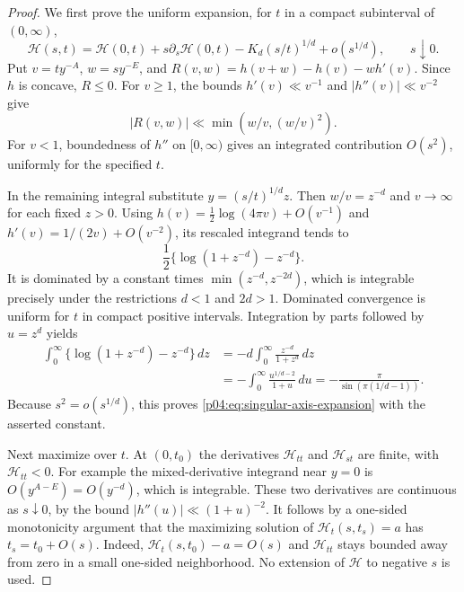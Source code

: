 \documentclass[11pt,letterpaper]{article}
\theoremstyle{definition}
\theoremstyle{remark}
\newcommand{\1}{\mathbf 1}
\begin{document}
\begin{proof}
We first prove the uniform expansion, for $t$ in a compact
subinterval of $(0,\infty)$,
\begin{equation}\label{p04:eq:singular-axis-expansion}
 \mathcal H(s,t)=\mathcal H(0,t)
       +s\partial_s\mathcal H(0,t)
       -K_d(s/t)^{1/d}+o(s^{1/d}),\qquad s\downarrow0.
\end{equation}
Put $v=ty^{-A}$, $w=sy^{-E}$, and
$R(v,w)=h(v+w)-h(v)-wh'(v)$. Since $h$ is concave,
$R\le0$. For $v\ge1$, the bounds $h'(v)\ll v^{-1}$ and
$|h''(v)|\ll v^{-2}$ give
\[
 |R(v,w)|\ll\min(w/v,(w/v)^2).
\]
For $v<1$, boundedness of $h''$ on $[0,\infty)$ gives an
integrated contribution $O(s^2)$, uniformly for the specified $t$.

In the remaining integral substitute $y=(s/t)^{1/d}z$.
Then $w/v=z^{-d}$ and $v\to\infty$ for each fixed $z>0$.
Using $h(v)=\frac12\log(4\pi v)+O(v^{-1})$ and
$h'(v)=1/(2v)+O(v^{-2})$, its rescaled integrand tends to
\[
 \frac12\{\log(1+z^{-d})-z^{-d}\}.
\]
It is dominated by a constant times
$\min(z^{-d},z^{-2d})$, which is integrable precisely under
the restrictions $d<1$ and $2d>1$. Dominated convergence is
uniform for $t$ in compact positive intervals. Integration by
parts followed by $u=z^d$ yields
\[
 \begin{split}
 \int_0^\infty\{\log(1+z^{-d})-z^{-d}\}\,dz
 &=-d\int_0^\infty\frac{z^{-d}}{1+z^d}\,dz\\
 &=-\int_0^\infty\frac{u^{1/d-2}}{1+u}\,du
 =-\frac\pi{\sin(\pi(1/d-1))}.
 \end{split}
\]
Because $s^2=o(s^{1/d})$, this proves
\eqref{p04:eq:singular-axis-expansion} with the asserted constant.

Next maximize over $t$. At $(0,t_0)$ the derivatives
$\mathcal H_{tt}$ and $\mathcal H_{st}$ are finite, with
$\mathcal H_{tt}<0$. For example the mixed-derivative integrand
near $y=0$ is $O(y^{A-E})=O(y^{-d})$, which is integrable.
These two derivatives are continuous as $s\downarrow0$, by the
bound $|h''(u)|\ll(1+u)^{-2}$. It follows by a one-sided
monotonicity argument that the maximizing solution of
$\mathcal H_t(s,t_s)=a$ has $t_s=t_0+O(s)$.
Indeed, $\mathcal H_t(s,t_0)-a=O(s)$ and
$\mathcal H_{tt}$ stays bounded away from zero in a small
one-sided neighborhood. No extension of $\mathcal H$ to negative
$s$ is used.


\end{proof}
\end{document}
